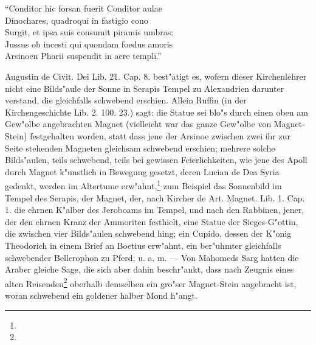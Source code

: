 \documentclass[a4paper, 11pt, oneside, polutonikogreek, german]{article}
\begin{document}
"`Conditor hic forsan fuerit Conditor aulae\\
\hspace*{0.5cm} Dinochares, quadroqui in fastigio cono\\
\hspace*{0.5cm} Surgit, et ipsa suis consumit piramis umbras:\\
\hspace*{0.5cm} Jussus ob incesti qui quondam foedus amoris\\
\hspace*{0.5cm} Arsinoen Pharii suspendit in aere templi."'

Augustin de Civit. Dei Lib. 21. Cap. 8. best"atigt es, wofern dieser Kirchenlehrer nicht eine Bilds"aule der Sonne in Serapis Tempel zu Alexandrien darunter verstand, die gleichfalls schwebend erschien. Allein Ruffin (in der Kirchengeschichte Lib. 2. 100. 23.) sagt: die Statue sei blo"s durch einen oben am Gew"olbe angebrachten Magnet (vielleicht war das ganze Gew"olbe von Magnet-Stein) festgehalten worden, statt dass jene der Arsinoe zwischen zwei ihr zur Seite stehenden Magneten gleichsam schwebend erschien; mehrere solche Bilds"aulen, teils schwebend, teils bei gewissen Feierlichkeiten, wie jene des Apoll durch Magnet k"unstlich in Bewegung gesetzt, deren Lucian de Dea Syria gedenkt, werden im Altertume erw"ahnt,\footnote{} zum Beispiel das Sonnenbild im Tempel des Serapis, der Magnet, der, nach Kircher de Art. Magnet. Lib. 1. Cap. 1. die ehrnen K"alber des Jeroboams im Tempel, und nach den Rabbinen, jener, der den ehrnen Kranz der Ammoriten festhielt, eine Statue der Sieges-G"ottin, die zwischen vier Bilds"aulen schwebend hing; ein Cupido, dessen der K"onig Theodorich in einem Brief an Boetius erw"ahnt, ein ber"uhmter gleichfalls schwebender Bellerophon zu Pferd, u. a. m. --- Von Mahomeds Sarg hatten die Araber gleiche Sage, die sich aber dahin beschr"ankt, dass nach Zeugnis eines alten Reisenden\footnote{} oberhalb demselben ein gro"ser Magnet-Stein angebracht ist, woran schwebend ein goldener halber Mond h"angt.
\end{document}
